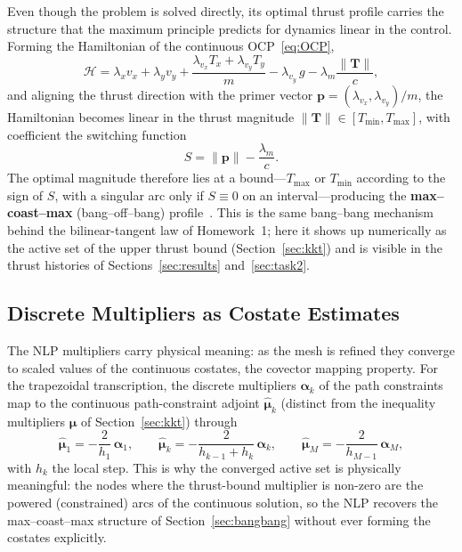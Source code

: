 \documentclass[../main.tex]{subfiles}
\begin{document}
Even though the problem is solved directly, its optimal thrust profile carries the structure that the maximum principle predicts for dynamics linear in the control. Forming the Hamiltonian of the continuous OCP~\eqref{eq:OCP},
\begin{equation}
    \mathcal{H} = \lambda_x v_x + \lambda_y v_y
    + \frac{\lambda_{v_x}T_x + \lambda_{v_y}T_y}{m}
    - \lambda_{v_y}\, g - \lambda_m\frac{\|\mathbf{T}\|}{c},
    \label{eq:hm2_hamiltonian}
\end{equation}
and aligning the thrust direction with the primer vector $\mathbf{p} = (\lambda_{v_x}, \lambda_{v_y})/m$, the Hamiltonian becomes linear in the thrust magnitude $\|\mathbf{T}\| \in [T_{\min}, T_{\max}]$, with coefficient the switching function
\begin{equation}
    S = \|\mathbf{p}\| - \frac{\lambda_m}{c}.
    \label{eq:hm2_switching}
\end{equation}
The optimal magnitude therefore lies at a bound---$T_{\max}$ or $T_{\min}$ according to the sign of $S$, with a singular arc only if $S \equiv 0$ on an interval---producing the \textbf{max--coast--max} (bang--off--bang) profile~\cite[Sec.~3.9]{bryson1975}. This is the same bang--bang mechanism behind the bilinear-tangent law of Homework~1; here it shows up numerically as the active set of the upper thrust bound (Section~\ref{sec:kkt}) and is visible in the thrust histories of Sections~\ref{sec:results} and~\ref{sec:task2}.

\subsection{Discrete Multipliers as Costate Estimates}\label{sec:covector}

The NLP multipliers carry physical meaning: as the mesh is refined they converge to scaled values of the continuous costates, the covector mapping property. For the trapezoidal transcription, the discrete multipliers $\boldsymbol{\alpha}_k$ of the path constraints map to the continuous path-constraint adjoint $\hat{\boldsymbol{\mu}}_k$ (distinct from the inequality multipliers $\boldsymbol{\mu}$ of Section~\ref{sec:kkt}) through~\cite[Sec.~4.11.2, Eqs.~(4.235)--(4.237)]{betts2010}
\begin{equation}
    \hat{\boldsymbol{\mu}}_1 = -\frac{2}{h_1}\,\boldsymbol{\alpha}_1,\qquad
    \hat{\boldsymbol{\mu}}_k = -\frac{2}{h_{k-1}+h_k}\,\boldsymbol{\alpha}_k,\qquad
    \hat{\boldsymbol{\mu}}_M = -\frac{2}{h_{M-1}}\,\boldsymbol{\alpha}_M,
    \label{eq:covector}
\end{equation}
with $h_k$ the local step. This is why the converged active set is physically meaningful: the nodes where the thrust-bound multiplier is non-zero are the powered (constrained) arcs of the continuous solution, so the NLP recovers the max--coast--max structure of Section~\ref{sec:bangbang} without ever forming the costates explicitly.
\end{document}
